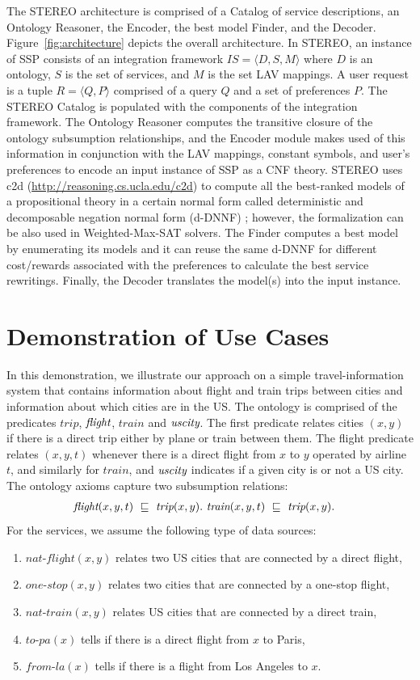 \documentclass{llncs}
\newcommand{\tup}[1]{\langle #1 \rangle}
\newcommand{\orule}{\sqsubseteq}
\newcommand{\flight}{\text{\it flight}}
\newcommand{\UScity}{\text{\it uscity}}
\newcommand{\trip}{\textit{trip}}
\newcommand{\train}{\textit{train}}
\newcommand{\nationaltlight}{\textit{nat-flight}}
\newcommand{\nationaltrain}{\textit{nat-train}}
\newcommand{\onestop}{\textit{one-stop}}
\newcommand{\toPA}{\textit{to-pa}}
\newcommand{\fromLA}{\textit{from-la}}
\begin{document}
 The STEREO architecture  is comprised of a Catalog of service descriptions,
 an Ontology Reasoner, the Encoder, the best model Finder,
and the Decoder.
Figure~\ref{fig:architecture} depicts the overall architecture. In STEREO, an instance of SSP consists of an integration framework $IS=\tup{D,S,M}$ where $D$ is an ontology, $S$ is the set
of services, and $M$ is the set LAV mappings. A user request is a tuple $R=\tup{Q,P}$ comprised of a query $Q$  and a set of preferences $P$. The STEREO Catalog is populated with the components of the integration framework. The Ontology Reasoner computes the transitive
closure of the ontology subsumption relationships, and the Encoder module makes used of this information in conjunction with the LAV mappings,  constant symbols,   and user's preferences to encode  an input instance of SSP as a CNF theory.
STEREO uses  c2d (\url{http://reasoning.cs.ucla.edu/c2d}) to compute all the
best-ranked models of a propositional theory  in a certain 
normal form called deterministic and decomposable negation normal
form (d-DNNF) \cite{darwiche:d-dnnfs}; however, the formalization can be also used in Weighted-Max-SAT solvers.
 The Finder computes a best model by enumerating its models  and it can reuse the same d-DNNF for different cost/rewards associated with the preferences to calculate  the best service rewritings. 
   Finally, the Decoder translates the model(s)  into the input instance.


\section{Demonstration of Use Cases}
In this demonstration, we illustrate our approach on  a simple travel-information system that contains information about
flight and train trips between cities and information about which cities
are in the US. The ontology is comprised of the predicates
$\trip$, $\flight$, $\train$ and $\UScity$.
The first predicate relates cities $(x,y)$ if there is a direct
trip either by plane or train between them. The flight predicate relates $(x,y,t)$ whenever there is a direct flight from $x$ to $y$ operated by airline $t$, and similarly for $\train$,
and $\UScity$ indicates if a given city is or not a US city. 
The ontology axioms capture two subsumption relations:
\begin{alignat*}{1}
\flight(x,y,t)\  \orule\ \trip(x,y).\  & \train(x,y,t)\  \orule\ \trip(x,y).
\end{alignat*}
For the services, we assume the following type of data sources:
\begin{enumerate}[--]
\item $\nationaltlight(x,y)$ relates two US cities that are connected by a direct flight,
\item $\onestop(x,y)$ relates two cities that are connected by a one-stop flight,
\item $\nationaltrain(x,y)$ relates US cities that are connected by a direct train,
\item $\toPA(x)$ tells if there is a direct flight from $x$ to Paris,
\item $\fromLA(x)$ tells if there is a flight from Los Angeles to $x$.
\end{enumerate}
\end{document}
